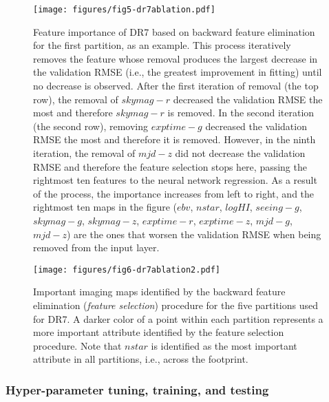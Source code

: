 \begin{figure}
    \centering
    \texttt{[image: figures/fig5-dr7ablation.pdf]}
    \caption{Feature importance of DR7 based on backward feature elimination for the first partition, as an example. This process iteratively removes the feature whose removal produces the largest decrease in the validation RMSE (i.e., the greatest improvement in fitting) until no decrease is observed. After the first iteration of removal (the top row), the removal of $skymag-r$ decreased the validation RMSE the most and therefore $skymag-r$ is removed. In the second iteration (the second row), removing $exptime-g$ decreased the validation RMSE the most and therefore it is removed. However, in the ninth iteration, the removal of $mjd-z$ did not decrease the validation RMSE and therefore the feature selection stops here, passing the rightmost ten features to the neural network regression. As a result of the process, the importance increases from left to right, and the rightmost ten maps in the figure ($ebv$, $nstar$, $logHI$, $seeing-g$, $skymag-g$, $skymag-z$, $exptime-r$, $exptime-z$, $mjd-g$, $mjd-z$) are the ones that worsen the validation RMSE when being removed from the input layer.}
    \label{fig:dr7ablation}
\end{figure}

\begin{figure}
    \centering
    \texttt{[image: figures/fig6-dr7ablation2.pdf]}
    \caption{Important imaging maps identified by the backward feature elimination (\textit{feature selection}) procedure for the five partitions used for DR7. A darker color of a point within each partition represents a more important attribute identified by the feature selection procedure. Note that $nstar$ is identified as the most important attribute in all partitions, i.e., across the footprint.}
    \label{fig:dr7ablation2}
\end{figure}
 

\subsubsection{Hyper-parameter tuning, training, and testing}\label{subsubsec:hyperparam}

